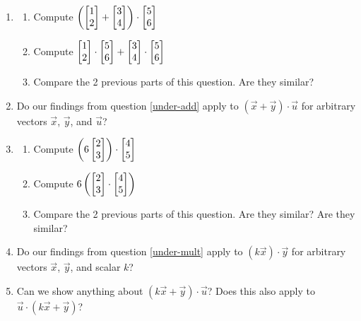 \begin{exercises}
\begin{problist}
		\prob
		\begin{enumerate}
			\item
			\label{under-add}
			\begin{enumerate}
				\item Compute $\left(\mat{1\\2} + \mat{3\\4}\right) \cdot \mat{5\\6}$
				\item Compute $\mat{1\\2} \cdot \mat{5\\6} + \mat{3\\4} \cdot \mat{5\\6}$
				\item Compare the 2 previous parts of this question. Are they similar?
			\end{enumerate}
			\item
			Do our findings from question \ref{under-add} apply to $(\vec x + \vec y) \cdot \vec u$
			for arbitrary vectors $\vec x$, $\vec y$, and $\vec u$?
			\item
			\label{under-mult}
			\begin{enumerate}
				\item Compute $\left(6\mat{2\\3}\right) \cdot \mat{4\\5}$
				\item Compute $6\left(\mat{2\\3} \cdot \mat{4\\5}\right)$
				\item Compare the 2 previous parts of this question. Are they similar?
				 Are they similar?
			\end{enumerate}
			\item
			Do our findings from question \ref{under-mult} apply to $(k\vec x) \cdot \vec y$
			for arbitrary vectors $\vec x$, $\vec y$, and scalar $k$?
			\item
			Can we show anything about $(k\vec x + \vec y) \cdot \vec u$?
			Does this also apply to $\vec u \cdot (k\vec x + \vec y)$?
		\end{enumerate}


	\end{problist}
\end{exercises}
